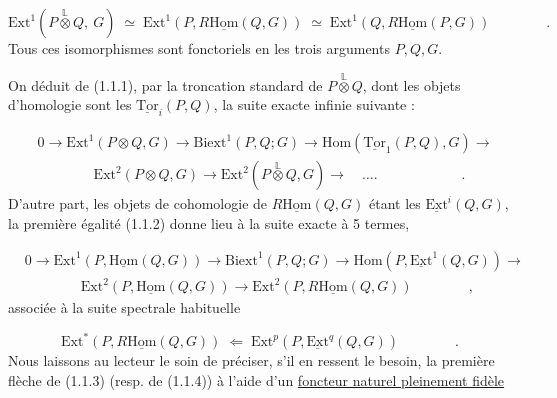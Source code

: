 \begin{equation}\tag{1.1.2}
\mathrm{Ext}^1(P\overset{\mathbb{L}}{\otimes}Q,\ G) \;\simeq\; \mathrm{Ext}^1(P,R\underline{\mathrm{Hom}}(Q,G)) \;\simeq\; \mathrm{Ext}^1(Q,R\underline{\mathrm{Hom}}(P,G)) \qquad\qquad .
\end{equation}
Tous ces isomorphismes sont fonctoriels en les trois arguments $P,Q,G$.

On déduit de (1.1.1), par la troncation standard de $P\overset{\mathbb{L}}{\otimes}Q$, dont les objets d'homologie sont les $\underline{\mathrm{Tor}}_i(P,Q)$, la suite exacte infinie suivante :

\begin{equation}\tag{1.1.3}
\begin{aligned}
&0 \longrightarrow \mathrm{Ext}^1(P\otimes Q,G) \longrightarrow \mathrm{Biext}^1(P,Q;G) \longrightarrow \mathrm{Hom}(\underline{\mathrm{Tor}}_1(P,Q),G) \longrightarrow \\
&\qquad\qquad \mathrm{Ext}^2(P\otimes Q,G) \longrightarrow \mathrm{Ext}^2(P\overset{\mathbb{L}}{\otimes} Q,G) \longrightarrow \quad \ldots. \qquad\qquad\qquad .
\end{aligned}
\end{equation}
D'autre part, les objets de cohomologie de $R\underline{\mathrm{Hom}}(Q,G)$ étant les $\underline{\mathrm{Ext}}^i(Q,G)$, la première égalité (1.1.2) donne lieu à la suite exacte à 5 termes,

\begin{equation}\tag{1.1.4}
\begin{aligned}
&0 \longrightarrow \mathrm{Ext}^1(P,\underline{\mathrm{Hom}}(Q,G)) \longrightarrow \mathrm{Biext}^1(P,Q;G) \longrightarrow \mathrm{Hom}(P,\underline{\mathrm{Ext}}^1(Q,G)) \longrightarrow \\
&\qquad\qquad \mathrm{Ext}^2(P,\underline{\mathrm{Hom}}(Q,G)) \longrightarrow \mathrm{Ext}^2(P,R\underline{\mathrm{Hom}}(Q,G)) \qquad\qquad ,
\end{aligned}
\end{equation}
associée à la suite spectrale habituelle

\begin{equation*}
\mathrm{Ext}^*(P,R\underline{\mathrm{Hom}}(Q,G)) \;\Longleftarrow\; \mathrm{Ext}^p(P,\underline{\mathrm{Ext}}^q(Q,G)) \qquad\qquad .
\end{equation*}
Nous laissons au lecteur le soin de préciser, s'il en ressent le besoin, la première flèche de (1.1.3) (resp. de (1.1.4)) à l'aide d'un \underline{foncteur naturel pleinement fidèle}

